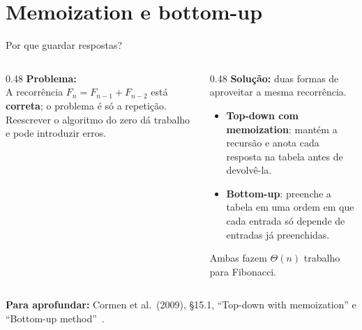 \documentclass[aspectratio=169,xcolor=table]{beamer}
\newcommand{\fonte}[1]{%
  \vfill
  {\tiny\color{gray!55!black}\textbf{Para aprofundar:} #1\par}%
}
\begin{document}
\section{Memoization e bottom-up}

\begin{frame}{Por que guardar respostas?}
  \begin{columns}[T]
    \begin{column}{0.48\textwidth}
      \textbf{Problema:}\\[2pt]
      \scriptsize A recorrência $F_n = F_{n-1}+F_{n-2}$ está \textbf{correta}; o problema é
      só a repetição. Reescrever o algoritmo do zero dá trabalho e pode introduzir erros.
    \end{column}
    \begin{column}{0.48\textwidth}
      \textbf{Solução:} duas formas de aproveitar a mesma recorrência.\\[2pt]
      \scriptsize
      \begin{itemize}\scriptsize
        \item \textbf{Top-down com memoization}: mantém a recursão e anota cada resposta
              na tabela antes de devolvê-la.
        \item \textbf{Bottom-up}: preenche a tabela em uma ordem em que cada entrada só
              depende de entradas já preenchidas.
      \end{itemize}
      Ambas fazem $\Theta(n)$ trabalho para Fibonacci.
    \end{column}
  \end{columns}
  \fonte{Cormen et al.\ (2009), \S 15.1, ``Top-down with memoization'' e ``Bottom-up
    method''~\cite{cormen2009introduction}.}
\end{frame}
\end{document}
